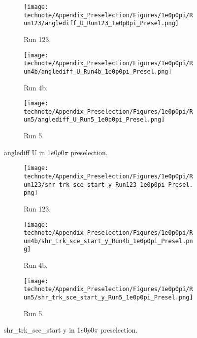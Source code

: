 \begin{figure}[H]
    \centering
    \begin{subfigure}[t]{0.32\linewidth}
        \texttt{[image: technote/Appendix\_Preselection/Figures/1e0p0pi/Run123/anglediff\_U\_Run123\_1e0p0pi\_Presel.png]}
        \caption{Run 123.}
    \end{subfigure}%
    \hspace{0.2cm}%
    \begin{subfigure}[t]{0.32\linewidth}
        \texttt{[image: technote/Appendix\_Preselection/Figures/1e0p0pi/Run4b/anglediff\_U\_Run4b\_1e0p0pi\_Presel.png]}
        \caption{Run 4b.}
    \end{subfigure}%
    \hspace{0.2cm}%
    \begin{subfigure}[t]{0.32\linewidth}
        \texttt{[image: technote/Appendix\_Preselection/Figures/1e0p0pi/Run5/anglediff\_U\_Run5\_1e0p0pi\_Presel.png]}
        \caption{Run 5.}
    \end{subfigure}
    \caption{anglediff U in 1$e$0$p$0$\pi$ preselection.}
\end{figure}

\begin{figure}[H]
    \centering
    \begin{subfigure}[t]{0.32\linewidth}
        \texttt{[image: technote/Appendix\_Preselection/Figures/1e0p0pi/Run123/shr\_trk\_sce\_start\_y\_Run123\_1e0p0pi\_Presel.png]}
        \caption{Run 123.}
    \end{subfigure}%
    \hspace{0.2cm}%
    \begin{subfigure}[t]{0.32\linewidth}
        \texttt{[image: technote/Appendix\_Preselection/Figures/1e0p0pi/Run4b/shr\_trk\_sce\_start\_y\_Run4b\_1e0p0pi\_Presel.png]}
        \caption{Run 4b.}
    \end{subfigure}%
    \hspace{0.2cm}%
    \begin{subfigure}[t]{0.32\linewidth}
        \texttt{[image: technote/Appendix\_Preselection/Figures/1e0p0pi/Run5/shr\_trk\_sce\_start\_y\_Run5\_1e0p0pi\_Presel.png]}
        \caption{Run 5.}
    \end{subfigure}
    \caption{shr\_trk\_sce\_start y in 1$e$0$p$0$\pi$ preselection.}
\end{figure}

